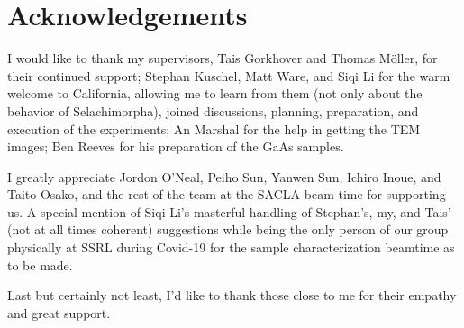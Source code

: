 \begingroup
\let\cleardoulbepage\relax
\let\clearepage\relax
\chapter*{Acknowledgements}
\endgroup
\onehalfspacing
I would like to thank my supervisors, Tais Gorkhover and Thomas Möller, for their continued support; 
Stephan Kuschel, Matt Ware, and Siqi Li for the warm welcome to California, allowing me to learn from them (not only about the behavior of Selachimorpha), joined discussions, planning, preparation, and execution of the experiments; An Marshal for the help in getting the TEM images; Ben Reeves for his preparation of the GaAs samples.

I greatly appreciate Jordon O'Neal, Peiho Sun, Yanwen Sun, Ichiro Inoue, and Taito Osako, and the rest of the team at the SACLA beam time for supporting us. A special mention of Siqi Li's masterful handling of Stephan's, my, and Tais' (not at all times coherent) suggestions while being the only person of our group physically at SSRL during Covid-19  for the sample characterization beamtime as to be made.

Last but certainly not least, I'd like to thank those close to me for their empathy and great support.
